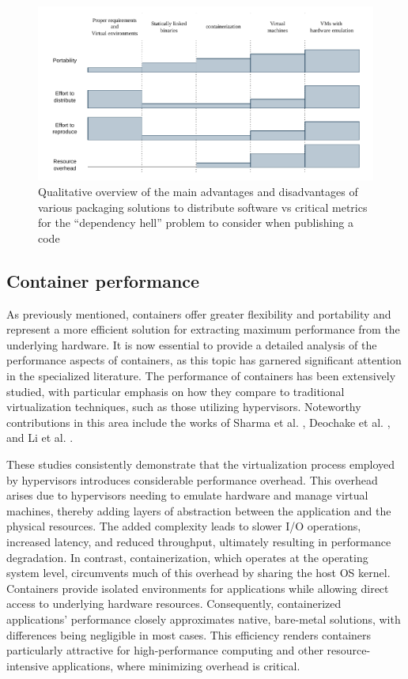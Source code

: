 \begin{figure}[h]
    \centering
    \includegraphics[width=\textwidth]{img/chpt1/solutions-spectrum}
    \caption{Qualitative overview of the main advantages and disadvantages of
      various packaging solutions to distribute software vs critical metrics for
      the ``dependency hell'' problem to consider when publishing a code}
    \label{fig:solspectrum}
\end{figure}


\subsection{Container performance}

As previously mentioned, containers offer greater flexibility and portability
and represent a more efficient solution for extracting maximum performance from
the underlying hardware.
It is now essential to provide a detailed analysis of
the performance aspects of containers, as this topic has garnered significant
attention in the specialized literature.
The performance of containers has been extensively studied, with particular
emphasis on how they compare to traditional virtualization techniques, such as
those utilizing hypervisors.
Noteworthy contributions in this area include the works of Sharma et al.
\cite{Sharma2016}, Deochake et al. \cite{deochake2023}, and Li et al.
\cite{Li2023}.

These studies consistently demonstrate that the virtualization process employed
by hypervisors introduces considerable performance overhead.
This overhead arises due to hypervisors needing to emulate hardware and manage
virtual machines, thereby adding layers of abstraction between the application
and the physical resources.
The added complexity leads to slower I/O operations, increased latency, and
reduced throughput, ultimately resulting in performance degradation.
In contrast, containerization, which operates at the operating system level,
circumvents much of this overhead by sharing the host OS kernel.
Containers provide isolated environments for applications while allowing direct
access to underlying hardware resources. Consequently, containerized
applications' performance closely approximates native, bare-metal solutions,
with differences being negligible in most cases.
This efficiency renders containers particularly attractive for high-performance
computing and other resource-intensive applications, where minimizing overhead
is critical.


